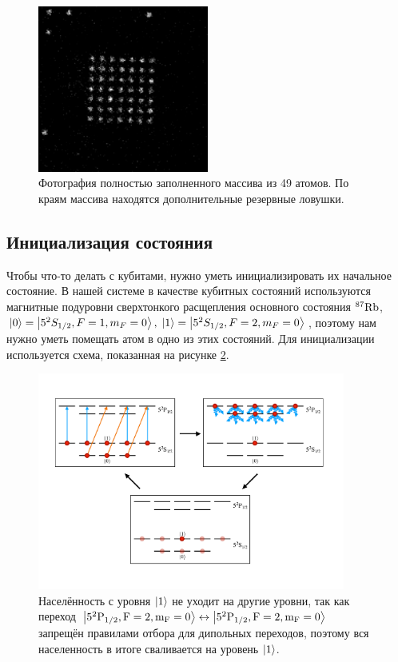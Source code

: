 \begin{figure}[ht]
	\centering
	\includegraphics[width=0.5\textwidth]{images/Array49.png}
	\caption{Фотография полностью заполненного массива из 49 атомов. По краям массива находятся дополнительные резервные ловушки. }
	\label{fig:array49}
\end{figure}

\subsection{Инициализация состояния}

Чтобы что-то делать с кубитами, нужно уметь инициализировать их начальное состояние. В нашей системе в качестве кубитных состояний используются магнитные подуровни сверхтонкого расщепления основного состояния $^{87}\rm{Rb}$, $\left| 0 \right\rangle=\left| 5^2S_{1/2},F=1,m_F=0 \right\rangle, \; \left| 1 \right\rangle=\left| 5^2S_{1/2},F=2,m_F=0 \right\rangle$, поэтому нам нужно уметь помещать атом в одно из этих состояний. Для инициализации используется схема, показанная на рисунке \ref{fig:initialization}.

\begin{figure}[ht]
	\centering
	\includegraphics[width=0.9\textwidth]{images/initialization_scheme.pdf}
	\caption{Населённость с уровня $\left| 1 \right\rangle$ не уходит на другие уровни, так как переход $\left| 5^2\rm{P}_{1/2},F=2,m_F=0 \right\rangle\leftrightarrow \left| 5^2\rm{P}_{1/2},F=2,m_F=0 \right\rangle$ запрещён правилами отбора для дипольных переходов, поэтому вся населенность в итоге сваливается на уровень $\left| 1 \right\rangle$.}
	\label{fig:initialization}
\end{figure}

